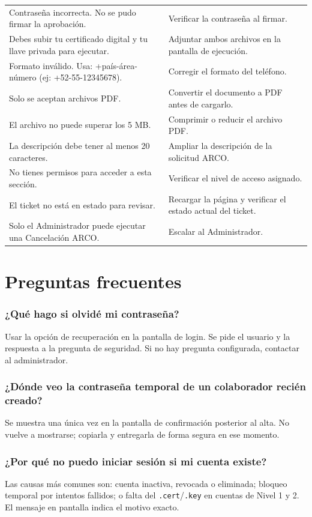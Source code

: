 \documentclass[10pt,letterpaper]{report}
\begin{document}
\begin{longtable}{p{} p{}}
Contraseña incorrecta. No se pudo firmar la aprobación. & Verificar la contraseña al firmar.\\
Debes subir tu certificado digital y tu llave privada para ejecutar. & Adjuntar ambos archivos en la pantalla de ejecución.\\
Formato inválido. Usa: +país-área-número (ej: +52-55-12345678). & Corregir el formato del teléfono.\\
Solo se aceptan archivos PDF.                  & Convertir el documento a PDF antes de cargarlo.\\
El archivo no puede superar los 5 MB.         & Comprimir o reducir el archivo PDF.\\
La descripción debe tener al menos 20 caracteres. & Ampliar la descripción de la solicitud ARCO.\\
No tienes permisos para acceder a esta sección. & Verificar el nivel de acceso asignado.\\
El ticket no está en estado para revisar.      & Recargar la página y verificar el estado actual del ticket.\\
Solo el Administrador puede ejecutar una Cancelación ARCO. & Escalar al Administrador.\\
\end{longtable}

\chapter{Preguntas frecuentes}

\subsection*{¿Qué hago si olvidé mi contraseña?}
Usar la opción de recuperación en la pantalla de login. Se pide el usuario y la respuesta a la pregunta de seguridad. Si no hay pregunta configurada, contactar al administrador.

\subsection*{¿Dónde veo la contraseña temporal de un colaborador recién creado?}
Se muestra una única vez en la pantalla de confirmación posterior al alta. No vuelve a mostrarse; copiarla y entregarla de forma segura en ese momento.

\subsection*{¿Por qué no puedo iniciar sesión si mi cuenta existe?}
Las causas más comunes son: cuenta inactiva, revocada o eliminada; bloqueo temporal por intentos fallidos; o falta del \texttt{.cert}/\texttt{.key} en cuentas de Nivel 1 y 2. El mensaje en pantalla indica el motivo exacto.
\end{document}
